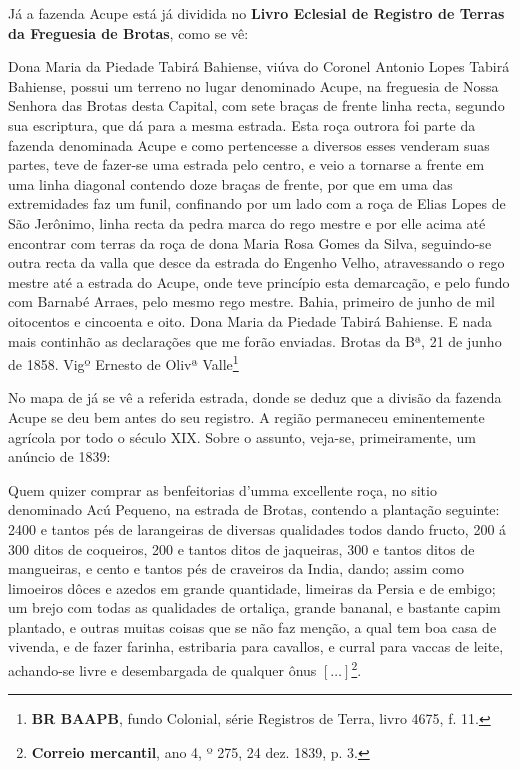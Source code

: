 Já a fazenda Acupe está já dividida no \textbf{Livro Eclesial de Registro de Terras da Freguesia de Brotas}, como se vê:

\begin{citacao}
Dona Maria da Piedade Tabirá Bahiense, viúva do Coronel Antonio Lopes Tabirá Bahiense, possui um terreno no lugar denominado Acupe, na freguesia de Nossa Senhora das Brotas desta Capital, com sete braças de frente linha recta, segundo sua escriptura, que dá para a mesma estrada. Esta roça outrora foi parte da fazenda denominada Acupe e como pertencesse a diversos esses venderam suas partes, teve de fazer-se uma estrada pelo centro, e veio a tornarse a frente em uma linha diagonal contendo doze braças de frente, por que em uma das extremidades faz um funil, confinando por um lado com a roça de Elias Lopes de São Jerônimo, linha recta da pedra marca do rego mestre e por elle acima até encontrar com terras da roça de dona Maria Rosa Gomes da Silva, seguindo-se outra recta da valla que desce da estrada do Engenho Velho, atravessando o rego mestre até a estrada do Acupe, onde teve princípio esta demarcação, e pelo fundo com Barnabé Arraes, pelo mesmo rego mestre. Bahia, primeiro de junho de mil oitocentos e cincoenta e oito. Dona Maria da Piedade Tabirá Bahiense. E nada mais continhão as declarações que me forão enviadas. Brotas da Bª, 21 de junho de 1858. Vigº Ernesto de Olivª Valle\footnote{\textbf{BR BAAPB}, fundo Colonial, série Registros de Terra, livro 4675, f. 11.}
\end{citacao}

No mapa de  já se vê a referida estrada, donde se deduz que a divisão da fazenda Acupe se deu bem antes do seu registro. A região permaneceu eminentemente agrícola por todo o século XIX. Sobre o assunto, veja-se, primeiramente, um anúncio de 1839:

\begin{citacao}
Quem quizer comprar as benfeitorias d'umma excellente roça, no sitio denominado Acú Pequeno, na estrada de Brotas, contendo a plantação seguinte: 2400 e tantos pés de larangeiras de diversas qualidades todos dando fructo, 200 á 300 ditos de coqueiros, 200 e tantos ditos de jaqueiras, 300 e tantos ditos de mangueiras, e cento e tantos pés de craveiros da India, dando; assim como limoeiros dôces e azedos em grande quantidade, limeiras da Persia e de embigo; um brejo com todas as qualidades de ortaliça, grande bananal, e bastante capim plantado, e outras muitas coisas que se não faz menção, a qual tem boa casa de vivenda, e de fazer farinha, estribaria para cavallos, e curral para vaccas de leite, achando-se livre e desembargada de qualquer ônus \([\dots]\)\footnote{\textbf{Correio mercantil}, ano 4, º 275, 24 dez. 1839, p. 3.}.
\end{citacao}

